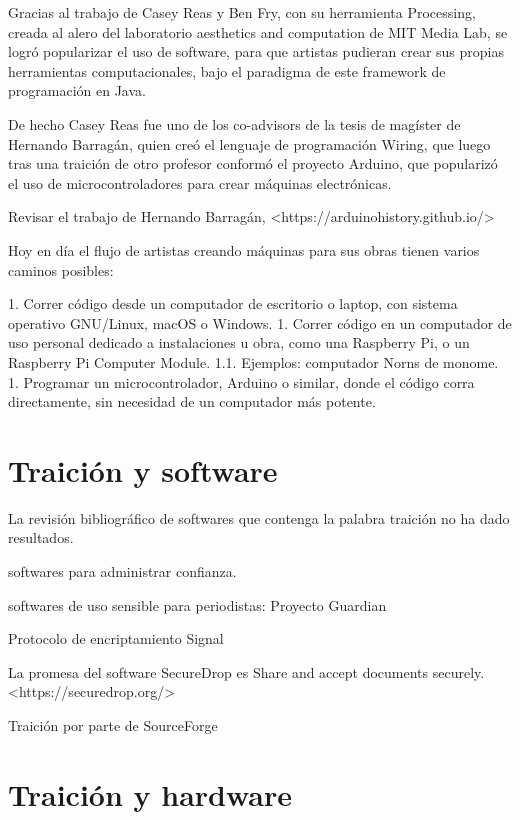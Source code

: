 \documentclass{article}
\begin{document}
Gracias al trabajo de Casey Reas y Ben Fry, con su herramienta Processing, creada al alero del laboratorio aesthetics and computation de MIT Media Lab, se logró popularizar el uso de software, para que artistas pudieran crear sus propias herramientas computacionales, bajo el paradigma de este framework de programación en Java.

De hecho Casey Reas fue uno de los co-advisors de la tesis de magíster de Hernando Barragán, quien creó el lenguaje de programación Wiring, que luego tras una traición de otro profesor conformó el proyecto Arduino, que popularizó el uso de microcontroladores para crear máquinas electrónicas.

Revisar el trabajo de Hernando Barragán, <https://arduinohistory.github.io/>

Hoy en día el flujo de artistas creando máquinas para sus obras tienen varios caminos posibles:

1. Correr código desde un computador de escritorio o laptop, con sistema operativo GNU/Linux, macOS o Windows.
1. Correr código en un computador de uso personal dedicado a instalaciones u obra, como una Raspberry Pi, o un Raspberry Pi Computer Module.
  1.1. Ejemplos: computador Norns de monome.
1. Programar un microcontrolador, Arduino o similar, donde el código corra directamente, sin necesidad de un computador más potente.

\section{Traición y software}

La revisión bibliográfico de softwares que contenga la palabra traición no ha dado resultados.

softwares para administrar confianza.

softwares de uso sensible para periodistas: Proyecto Guardian \cite{guardianProject}

Protocolo de encriptamiento Signal \cite{signal}

La promesa del software SecureDrop es Share and accept documents securely. <https://securedrop.org/>

Traición por parte de SourceForge \cite{sourceForgeWiki} \cite{sourceForgeArs}

\clearpage

\section{Traición y hardware}
\end{document}

